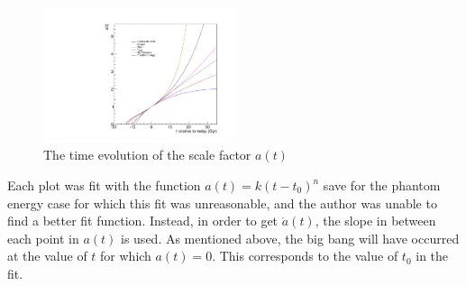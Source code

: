 \documentclass[aps,reprint,prl,floatfix,nofootinbib]{revtex4-1}
\begin{document}
\begin{figure}[H]
\includegraphics[width=0.5\textwidth]{ps1_plots/a1-6}
\caption{The time evolution of the scale factor $a(t)$}
\end{figure}

Each plot was fit with the function $a(t)=k(t-t_0)^n$ save for the phantom energy case for which this fit was unreasonable, and the author was unable to find a better fit function.  Instead, in order to get $\dot{a}(t)$, the slope in between each point in $a(t)$ is used.  As mentioned above, the big bang will have occurred at the value of $t$ for which $a(t) = 0$.  This corresponds to the value of $t_0$ in the fit.\\
\end{document}
